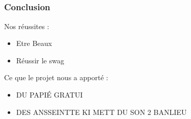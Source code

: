 


\subsection{} %

\speaker{\Pierre}
\begin{frame}
\frametitle{Conclusion}
	Nos réussites :
	\begin{itemize}
		\item Etre Beaux
		\item Réussir le swag
	\end{itemize}
	
	Ce que le projet nous a apporté : 
	\begin{itemize}
		\item DU PAPIÉ GRATUI
		\item DES ANSSEINTTE KI METT DU SON 2 BANLIEU
	\end{itemize}
\end{frame}
